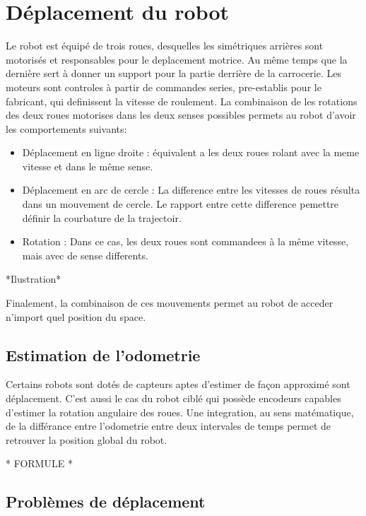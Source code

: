 \section{Déplacement du robot}

Le robot est équipé de trois roues, desquelles les simétriques
arrières sont motorisés et responsables pour le deplacement
motrice. Au même temps que la dernière sert à donner un support pour
la partie derrière de la carrocerie. Les moteurs sont controles à
partir de commandes series, pre-establis pour le fabricant, qui
definissent la vitesse de roulement. La combinaison de les rotations
des deux roues motorises dans les deux senses possibles permets au
robot d'avoir les comportements suivants:

\begin {itemize}
\item Déplacement en ligne droite : équivalent a les deux roues rolant
  avec la meme vitesse et dans le même sense.

\item Déplacement en arc de cercle : La difference entre les vitesses
  de roues résulta dans un mouvement de cercle. Le rapport entre cette
  difference pemettre définir la courbature de la trajectoir.

\item Rotation : Dans ce cas, les deux roues sont commandees à la même
  vitesse, mais avec de sense differents.
\end{itemize}

*Ilustration*

Finalement, la combinaison de ces mouvements permet au robot de
acceder n'import quel position du space.

\subsection{Estimation de l'odometrie}

Certains robots sont dotés de capteurs aptes d'estimer de façon
approximé sont déplacement. C'est aussi le cas du robot ciblé qui
possède encodeurs capables d'estimer la rotation angulaire des
roues. Une integration, au sens matématique, de la différance entre
l'odometrie entre deux intervales de temps permet de retrouver la
position global du robot.

* FORMULE *

\subsection{Problèmes de déplacement}

